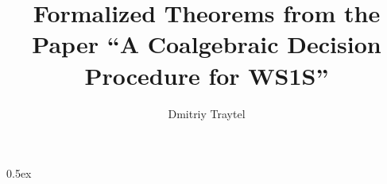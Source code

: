 \documentclass[11pt,a4paper]{article}
\begin{document}
\title{Formalized Theorems from the Paper ``A Coalgebraic Decision Procedure for WS1S''}
\author{Dmitriy Traytel}
\maketitle

\parindent 0pt\parskip 0.5ex



%
%
\end{document}
